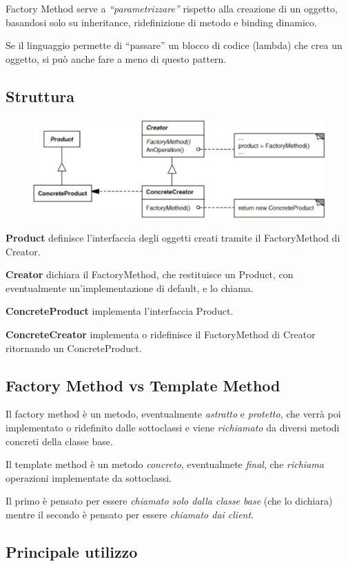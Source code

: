 Factory Method serve a \textit{“parametrizzare”} rispetto alla creazione di un oggetto, basandosi solo su inheritance, ridefinizione di metodo e binding dinamico.

Se il linguaggio permette di “passare” un blocco di codice (lambda) che crea un oggetto, si può anche fare a meno di questo pattern.

\subsection{Struttura}

\begin{figure}[H]
    \centering
    \includegraphics[width=0.5\linewidth]{../../immagini/pattern_creazionale/struttura_factory_method}
\end{figure}

\textbf{Product} definisce l'interfaccia degli oggetti creati tramite il FactoryMethod di Creator.

\textbf{Creator} dichiara il FactoryMethod, che restituisce un Product, con eventualmente un'implementazione di default, e lo chiama.

\textbf{ConcreteProduct} implementa l'interfaccia Product.

\textbf{ConcreteCreator} implementa o ridefinisce il FactoryMethod di Creator ritornando un ConcreteProduct.

\subsection{Factory Method vs Template Method}

Il factory method è un metodo, eventualmente \textit{astratto} e \textit{protetto}, che verrà poi implementato o ridefinito dalle sottoclassi e viene 
\textit{richiamato} da diversi metodi concreti della classe base.

Il template method è un metodo \textit{concreto}, eventualmete \textit{final}, che \textit{richiama} operazioni implementate da sottoclassi.

Il primo è pensato per essere \textit{chiamato solo dalla classe base} (che lo dichiara) mentre il secondo è pensato per essere \textit{chiamato dai client}.

\subsection{Principale utilizzo}

